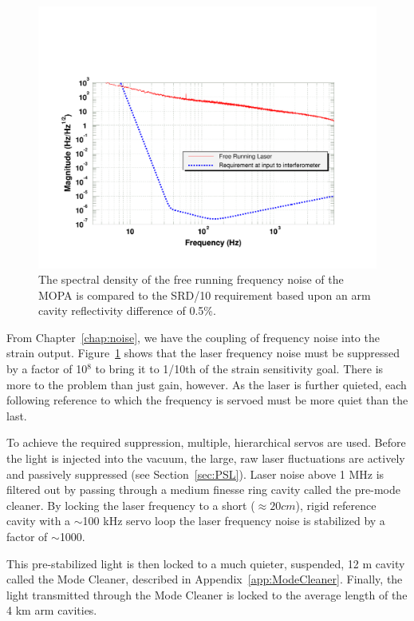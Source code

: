 \begin{figure}[!h]
\centerline{\includegraphics[angle=0,width=6.5in]{Figures/Chap5/FreqNoiseReq.pdf}}
\caption[Laser Frequency Noise]{The spectral density of the free running 
         frequency noise of the MOPA is compared to the SRD/10 requirement 
         based upon an arm cavity reflectivity difference of 0.5\%.}
\label{fig:FreqNoiseReq}
\end{figure}
From Chapter~\ref{chap:noise}, we have the coupling of frequency noise 
into the strain output.
Figure~\ref{fig:FreqNoiseReq} shows that the laser frequency noise must be 
suppressed by a factor of 10$^8$ to bring it to 1/10th of the strain 
sensitivity goal. There is more to
the problem than just gain, however. As the laser is further quieted, each
following reference to which the frequency is servoed must be more quiet than
the last.

To achieve the required suppression, multiple, hierarchical servos are used.
Before the light is injected into the vacuum, the large, raw laser fluctuations 
are actively and passively suppressed (see Section~\ref{sec:PSL}). 
Laser noise above 1 MHz
is filtered out by passing through a medium finesse ring cavity called
the pre-mode cleaner. By locking the laser frequency to a short ($\approx 20 cm$), 
rigid reference cavity with a $\sim$100 kHz servo loop the laser frequency noise
is stabilized by a factor of $\sim$1000.
 
This pre-stabilized light is then locked to a much quieter, suspended,
12 m cavity called the Mode Cleaner, described in Appendix~\ref{app:ModeCleaner}. 
Finally, the light transmitted through the Mode Cleaner is locked to the 
average length of the 4 km arm cavities.

